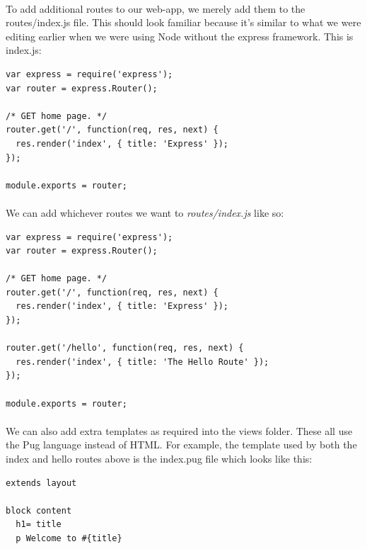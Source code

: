 \documentclass[10pt, a4paper, twosize]{article}
\begin{document}
\paragraph{} To add additional routes to our web-app, we merely add them to the routes/index.js file. This should look familiar because it's similar to what we were editing earlier when we were using Node without the express framework. This is index.js:

\begin{lstlisting}
var express = require('express');
var router = express.Router();

/* GET home page. */
router.get('/', function(req, res, next) {
  res.render('index', { title: 'Express' });
});

module.exports = router;
\end{lstlisting}

\paragraph{} We can add whichever routes we want to \emph{routes/index.js} like so:

\begin{lstlisting}
var express = require('express');
var router = express.Router();

/* GET home page. */
router.get('/', function(req, res, next) {
  res.render('index', { title: 'Express' });
});

router.get('/hello', function(req, res, next) {
  res.render('index', { title: 'The Hello Route' });
});

module.exports = router;
\end{lstlisting}

\paragraph{} We can also add extra templates as required into the views folder. These all use the Pug language instead of HTML. For example, the template used by both the index and hello routes above is the index.pug file which looks like this:

\begin{lstlisting}
extends layout

block content
  h1= title
  p Welcome to #{title}
\end{lstlisting}
\end{document}

